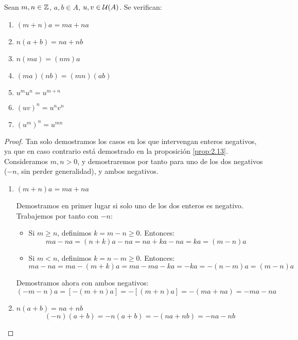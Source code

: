 \begin{prop}
    Sean $m,n \in \mathbb Z$, $a,b \in A$, $u,v \in \mathcal{U}(A)$. Se verifican:
    \begin{enumerate}
        \item $(m+n)a = ma+na$
        \item $n(a+b) = na + nb$
        \item $n(ma) = (nm)a$
        \item $(ma)(nb) = (mn)(ab)$
        \item $u^mu^n = u^{m+n}$
        \item $(uv)^n = u^nv^n$
        \item $(u^m)^n = u^{mn}$
    \end{enumerate}
\end{prop}
\begin{proof} Tan solo demostramos los casos en los que intervengan enteros negativos, ya que en caso contrario está demostrado en la proposición \ref{prop:2.13}. Consideramos $m,n>0$, y demostraremos por tanto para uno de los dos negativos ($-n$, sin perder generalidad), y ambos negativos.
    \begin{enumerate}
        \item $(m+n)a = ma+na$

        Demostramos en primer lugar si solo uno de los dos enteros es negativo. Trabajemos por tanto con $-n$:
        \begin{itemize}
            \item Si $m\geq n$, definimos $k=m-n\geq 0$. Entonces:
            \begin{equation*}
                ma-na = (n+k)a - na = na + ka -na = ka = (m-n)a
            \end{equation*}

            \item Si $m< n$, definimos $k=n-m\geq 0$. Entonces:
            \begin{equation*}
                ma-na = ma -(m+k)a = ma - ma -ka = -ka = -(n-m)a = (m-n)a
            \end{equation*}
        \end{itemize}

        Demostramos ahora con ambos negativos:
        \begin{equation*}
            (-m-n)a = [-(m+n)a] = -[(m+n)a] = -(ma+na) = -ma - na
        \end{equation*}
        
        \item $n(a+b) = na + nb$
        \begin{equation*}
            (-n)(a+b) = -n(a+b) = -(na+nb) = -na -nb
        \end{equation*}
        

\end{enumerate}
\end{proof}
